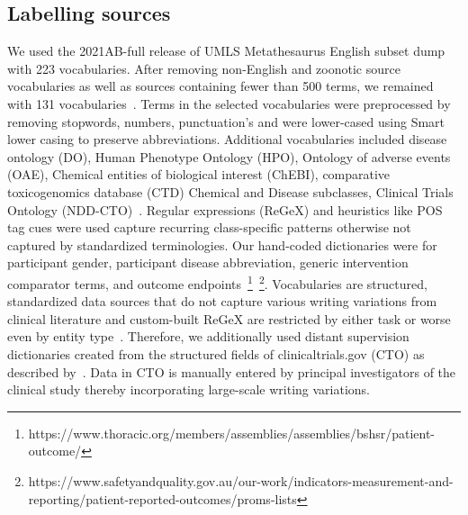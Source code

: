 \documentclass[10.7pt,]{article}
\begin{document}
\subsection{Labelling sources}\label{lss}
%
We used the 2021AB-full release of UMLS Metathesaurus English subset dump with 223 vocabularies. %
After removing non-English and zoonotic source vocabularies as well as sources containing fewer than 500 terms, we remained with 131 vocabularies~\cite{humphreys1998unified}.
Terms in the selected vocabularies were preprocessed by removing stopwords, numbers, punctuation's and were lower-cased using Smart lower casing to preserve abbreviations.
Additional vocabularies included disease ontology (DO), Human Phenotype Ontology (HPO), Ontology of adverse events (OAE), Chemical entities of biological interest (ChEBI),  comparative toxicogenomics database (CTD) Chemical and Disease subclasses, Clinical Trials Ontology (NDD-CTO)~\cite{schriml2012disease,robinson2008human,he2014oae,de2010chemical,lin2021cto}.
Regular expressions (ReGeX) and heuristics like POS tag cues were used capture recurring class-specific patterns otherwise not captured by standardized terminologies. 
Our hand-coded dictionaries were for participant gender, participant disease abbreviation, generic intervention comparator terms, and outcome endpoints~\footnote{https://www.thoracic.org/members/assemblies/assemblies/bshsr/patient-outcome/}~\footnote{https://www.safetyandquality.gov.au/our-work/indicators-measurement-and-reporting/patient-reported-outcomes/proms-lists}.
Vocabularies are structured, standardized data sources that do not capture various writing variations from clinical literature and custom-built ReGeX are restricted by either task or worse even by entity type~\cite{ratner2017snorkel,safranchik2020weakly}.
Therefore, we additionally used distant supervision dictionaries created from the structured fields of clinicaltrials.gov (CTO) as described by~\cite{dhrangadhariya2022distant}.
Data in CTO is manually entered by principal investigators of the clinical study thereby incorporating large-scale writing variations. 
%
%
%
\end{document}
